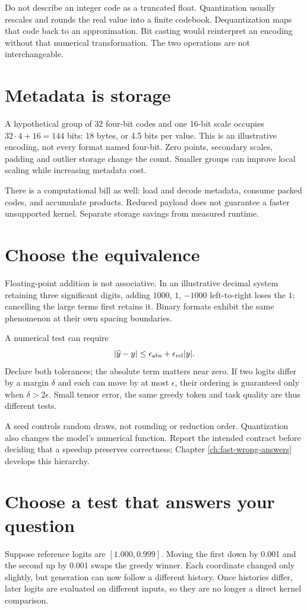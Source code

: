 Do not describe an integer code as a truncated float. Quantization
usually rescales and rounds the real value into a finite codebook.
Dequantization maps that code back to an approximation. Bit casting
would reinterpret an encoding without that numerical transformation.
The two operations are not interchangeable.

\section{Metadata is storage}
A hypothetical group of 32 four-bit codes and one 16-bit scale occupies
$32\cdot4+16=144$ bits: 18 bytes, or 4.5 bits per value.
This is an illustrative encoding, not every format named four-bit.
Zero points, secondary scales, padding and outlier storage change the count.
Smaller groups can improve local scaling while increasing metadata cost.

There is a computational bill as well: load and decode metadata, consume
packed codes, and accumulate products. Reduced payload does not guarantee
a faster unsupported kernel. Separate storage savings from measured runtime.

\section{Choose the equivalence}
Floating-point addition is not associative. In an illustrative decimal
system retaining three significant digits, adding $1000$, $1$, $-1000$
left-to-right loses the $1$; cancelling the large terms first retains it.
Binary formats exhibit the same phenomenon at their own spacing boundaries.

A numerical test can require
\[
 |\widehat y-y|\leq\epsilon_{\rm abs}+\epsilon_{\rm rel}|y|.
\]
Declare both tolerances; the absolute term matters near zero. If two logits
differ by a margin $\delta$ and each can move by at most $\epsilon$, their
ordering is guaranteed only when $\delta>2\epsilon$. Small tensor error,
the same greedy token and task quality are thus different tests.

A seed controls random draws, not rounding or reduction order. Quantization
also changes the model's numerical function. Report the intended contract
before deciding that a speedup preserves correctness; Chapter
\ref{ch:fast-wrong-answers} develops this hierarchy.

\section{Choose a test that answers your question}
Suppose reference logits are $[1.000,0.999]$. Moving the first down by
0.001 and the second up by 0.001 swaps the greedy winner. Each
coordinate changed only slightly, but generation can now follow a
different history. Once histories differ, later logits are evaluated
on different inputs, so they are no longer a direct kernel comparison.

